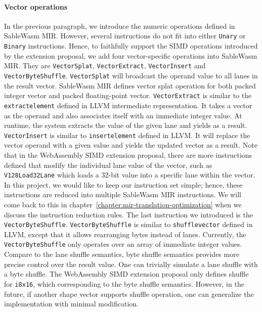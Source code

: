 \paragraph{Vector operations}
In the previous paragraph, we introduce the numeric operations defined in
SableWasm MIR. However, several instructions do not fit into either
\texttt{Unary} or \texttt{Binary} instructions. Hence, to faithfully support the
SIMD operations introduced by the extension proposal, we add four
vector-specific operations into SableWasm MIR. They are \texttt{VectorSplat},
\texttt{VectorExtract}, \texttt{VectorInsert} and \texttt{VectorByteShuffle}.
\texttt{VectorSplat} will broadcast the operand value to all lanes in the result
vector. SableWasm MIR defines vector splat operation for both packed integer
vector and packed floating-point vector. \texttt{VectorExtract} is similar to
the \texttt{extractelement} defined in LLVM intermediate representation. It
takes a vector as the operand and also associates itself with an immediate
integer value. At runtime, the system extracts the value of the given lane and
yields as a result. \texttt{VectorInsert} is similar to \texttt{insertelement}
defined in LLVM. It will replace the vector operand with a given value and
yields the updated vector as a result. Note that in the WebAssembly SIMD
extension proposal, there are more instructions defined that modify the
individual lane value of the vector, such as \texttt{V128Load32Lane} which
loads a 32-bit value into a specific lane within the vector. In this project,
we would like to keep our instruction set simple; hence, these instructions are
reduced into multiple SableWasm MIR instructions. We will come back to this
in chapter~\ref{chapter:mir-translation-optimization}
when we discuss the instruction reduction rules. The last
instruction we introduced is the \texttt{VectorByteShuffle}.
\texttt{VectorByteShuffle} is similar to \texttt{shufflevector} defined in LLVM,
except that it allows rearranging bytes instead of lanes. Currently, the
\texttt{VectorByteShuffle} only operates over an array of immediate integer
values. Compare to the lane shuffle semantics, byte shuffle semantics provides
more precise control over the result value. One can trivially simulate a lane
shuffle with a byte shuffle. The WebAssembly SIMD extension proposal only
defines shuffle for \texttt{i8x16}, which corresponding to the byte shuffle
semantics. However, in the future, if another shape vector supports shuffle
operation, one can generalize the implementation with minimal modification.

